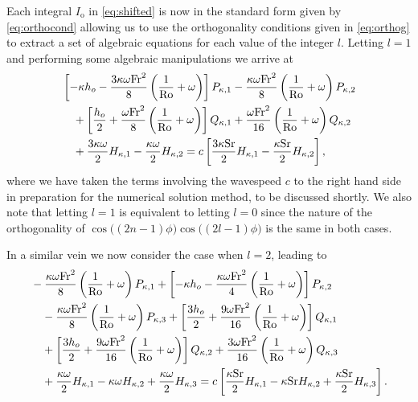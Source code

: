 Each integral $I_{\text{o}}$ in \eqref{eq:shifted} is now in the standard form given by \eqref{eq:orthocond} allowing us to use the orthogonality conditions given in \eqref{eq:orthog} to extract a set of algebraic equations for each value of the integer $l$. Letting $l=1$ and performing some algebraic manipulations we arrive at
\begin{align}
&\left[-\kappa h_o -\frac{3\kappa \omega \mathrm{Fr}^2}{8}\left( \frac{1}{\mathrm{Ro}}+\omega \right)\right] P_{\kappa,1} -\frac{\kappa \omega \mathrm{Fr}^2}{8}\left( \frac{1}{\mathrm{Ro}}+\omega \right)P_{\kappa,2} \notag \\
&\quad+ \left[\frac{h_o}{2} +\frac{\omega \mathrm{Fr}^2}{8}\left( \frac{1}{\mathrm{Ro}}+\omega \right)\right] Q_{\kappa,1} + \frac{\omega \mathrm{Fr}^2}{16}\left( \frac{1}{\mathrm{Ro}}+\omega \right) Q_{\kappa,2} \notag \\
&\quad+\frac{3\kappa \omega}{2}H_{\kappa,1}-\frac{\kappa \omega}{2}H_{\kappa,2}=c\left[\frac{3\kappa \mathrm{Sr}}{2}H_{\kappa,1}-\frac{\kappa \mathrm{Sr}}{2}H_{\kappa,2} \right],\label{eq:massl0}
\end{align}
where we have taken the terms involving the wavespeed $c$ to the right hand side in preparation for the numerical solution method, to be discussed shortly. We also note that letting $l=1$ is equivalent to letting $l=0$ since the nature of the orthogonality of $\cos\bigl((2n-1)\phi\bigr)\cos\bigl((2l-1)\phi\bigr)$ is the same in both cases.

In a similar vein we now consider the case when $l=2$, leading to
\begin{align}
&-\frac{\kappa \omega \mathrm{Fr}^2}{8}\left( \frac{1}{\mathrm{Ro}}+\omega \right)P_{\kappa,1} + \left[-\kappa h_o -\frac{\kappa \omega \mathrm{Fr}^2}{4}\left( \frac{1}{\mathrm{Ro}}+\omega \right)\right] P_{\kappa,2} \notag \\
&\quad-\frac{\kappa \omega \mathrm{Fr}^2}{8}\left( \frac{1}{\mathrm{Ro}}+\omega \right)P_{\kappa,3} + \left[\frac{3 h_o}{2} +\frac{9\omega \mathrm{Fr}^2}{16}\left( \frac{1}{\mathrm{Ro}}+\omega \right)\right] Q_{\kappa,1} \notag \\
&\quad+\left[\frac{3 h_o}{2} +\frac{9\omega \mathrm{Fr}^2}{16}\left( \frac{1}{\mathrm{Ro}}+\omega \right)\right] Q_{\kappa,2} +\frac{3\omega \mathrm{Fr}^2}{16}\left( \frac{1}{\mathrm{Ro}}+\omega \right) Q_{\kappa,3} \notag \\
&\quad+\frac{\kappa \omega}{2}H_{\kappa,1}-\kappa \omega H_{\kappa,2}+\frac{\kappa \omega}{2}H_{\kappa,3}=c\left[\frac{\kappa \mathrm{Sr}}{2} H_{\kappa,1}-\kappa \mathrm{Sr} H_{\kappa,2}+\frac{\kappa \mathrm{Sr}}{2} H_{\kappa,3} \right]. \label{eq:massl2}
\end{align}

